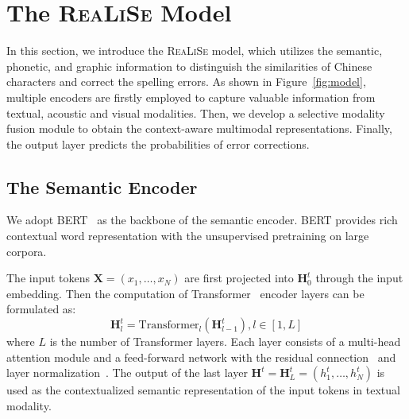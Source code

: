 \documentclass[11pt,a4paper]{article}
\newcommand\model{\textsc{ReaLiSe}}
\begin{document}
\section{The \model{} Model}


In this section, we introduce the \model{} model, which utilizes the semantic, phonetic, and graphic information to distinguish the similarities of Chinese characters and correct the spelling errors.
As shown in Figure~\ref{fig:model}, multiple encoders are firstly employed to capture valuable information from textual, acoustic and visual modalities. Then, we develop a selective modality fusion module to obtain the context-aware multimodal representations. Finally, the output layer predicts the probabilities of error corrections.

\subsection{The Semantic Encoder}

We adopt BERT~\citep{bert} as the backbone of the semantic encoder. 
BERT provides rich contextual word representation with the unsupervised pretraining on large corpora.


The input tokens $\mathbf{X}=(x_1, \dots, x_N)$ are first projected into $\mathbf{H}^t_0$ through the input embedding.
Then the computation of Transformer~\citep{transformer} encoder layers can be formulated as:
\begin{equation}
    \mathbf{H}^t_l = \text{Transformer}_l (\mathbf{H}^t_{l-1}), l \in [1, L]
\end{equation}
where $L$ is the number of Transformer layers. 
Each layer consists of a multi-head attention module and a feed-forward network with the residual connection~\citep{resnet} and layer normalization~\citep{layer_norm}. 
The output of the last layer $\mathbf{H}^t=\mathbf{H}^t_{L}=(h^t_1, \dots, h^t_N)$ is used as the contextualized semantic representation of the input tokens in textual modality.
\end{document}
